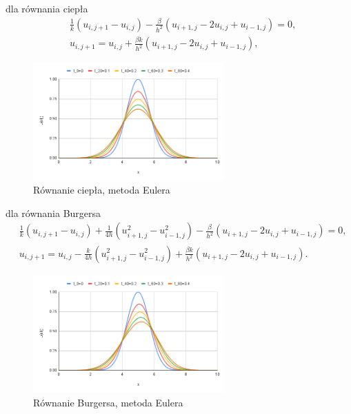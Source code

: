 \documentclass[12pt, a4paper]{article}
\begin{document}
dla równania ciepła
\begin{equation}
\begin{split}
& \frac{1}{k}(u_{i,j+1}-u_{i,j})-\frac{\beta}{h^{2}}(u_{i+1,j}-2u_{i,j}+u_{i-1,j})=0,\\
& u_{i,j+1}=u_{i,j}+\frac{\beta k}{h^{2}}(u_{i+1,j}-2u_{i,j}+u_{i-1,j}),
\end{split}
\end{equation}
\begin{figure}[h]
\caption{Równanie ciepła, metoda Eulera}
\centering
\includegraphics[width=0.65\textwidth]{2.png}
\end{figure}

dla równania Burgersa
\begin{equation}
\begin{split}
& \frac{1}{k}(u_{i,j+1}-u_{i,j})+\frac{1}{4h}(u_{i+1,j}^{2}-u_{i-1,j}^{2})-\frac{\beta}{h^{2}}(u_{i+1,j}-2u_{i,j}+u_{i-1,j})=0,\\
& u_{i,j+1}=u_{i,j}-\frac{k}{4h}(u_{i+1,j}^{2}-u_{i-1,j}^{2})+\frac{\beta k}{h^{2}}(u_{i+1,j}-2u_{i,j}+u_{i-1,j}).
\end{split}
\end{equation}
\begin{figure}[h]
\caption{Równanie Burgersa, metoda Eulera}
\centering
\includegraphics[width=0.65\textwidth]{3}
\end{figure}
\newpage
\end{document}
